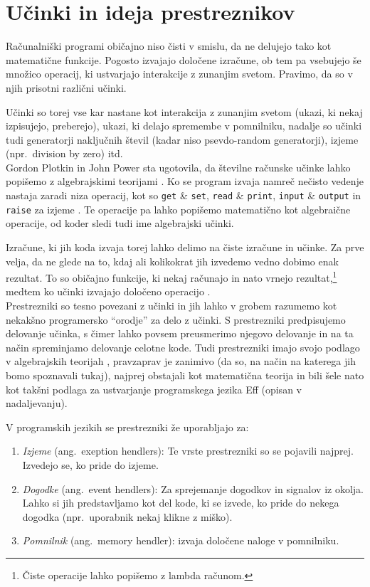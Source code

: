 \documentclass[a4paper,12pt]{article}
\theoremstyle{definition} %
\begin{document}
\section{Učinki in ideja prestreznikov}

Računalniški programi običajno niso čisti v smislu, da ne delujejo tako kot matematične funkcije. Pogosto izvajajo določene izračune, ob tem pa vsebujejo še množico operacij, ki ustvarjajo interakcije z zunanjim svetom. Pravimo, da so v njih prisotni različni učinki. 

Učinki so torej vse kar nastane kot interakcija z zunanjim svetom (ukazi, ki nekaj izpisujejo, preberejo), ukazi, ki delajo spremembe v pomnilniku, nadalje so učinki tudi generatorji naključnih števil (kadar niso psevdo-random generatorji), izjeme (npr.\ division by zero) itd. \\

Gordon Plotkin in John Power sta ugotovila, da številne računske učinke lahko popišemo z algebrajskimi teorijami \cite{algebraic}. Ko se program izvaja namreč nečisto vedenje nastaja zaradi niza operacij, kot so \lstinline{get} \& \lstinline{set}, \lstinline{read} \& \lstinline{print}, \lstinline{input} \& \lstinline{output} in \lstinline{raise} za izjeme \cite{introduction}. Te operacije pa lahko popišemo matematično kot algebraične operacije, od koder sledi tudi ime algebrajski učinki.

Izračune, ki jih koda izvaja torej lahko delimo na čiste izračune in učinke. Za prve velja, da ne glede na to, kdaj ali kolikokrat jih izvedemo vedno dobimo enak rezultat. To so običajno funkcije, ki nekaj računajo in nato vrnejo rezultat,\footnote{Čiste operacije lahko popišemo z lambda računom.} medtem ko učinki izvajajo določeno operacijo \cite{algebraic}. \\

Prestrezniki so tesno povezani z učinki in jih lahko v grobem razumemo kot nekakšno programersko  "`orodje"' za delo z učinki. S prestrezniki predpisujemo delovanje učinka, s čimer lahko povsem preusmerimo njegovo delovanje in na ta način spreminjamo delovanje celotne kode. Tudi prestrezniki imajo svojo podlago v algebrajskih teorijah \cite{algebraic}, pravzaprav je zanimivo (da so, na način na katerega jih bomo spoznavali tukaj), najprej obstajali kot matematična teorija in bili šele nato kot takšni podlaga za ustvarjanje programskega jezika Eff (opisan v nadaljevanju).

V programskih jezikih se prestrezniki že uporabljajo za:
\begin{enumerate}
\item \emph{Izjeme} (ang.\ exeption hendlers):  Te vrste prestrezniki so se pojavili najprej. Izvedejo se, ko pride do izjeme.
\item  \emph{Dogodke} (ang.\ event hendlers): Za sprejemanje dogodkov in signalov iz okolja. Lahko si jih predstavljamo kot del kode, ki se izvede, ko pride do nekega dogodka (npr.\ uporabnik nekaj klikne z miško).
\item \emph{Pomnilnik} (ang.\ memory hendler): izvaja določene naloge v pomnilniku.
\end{enumerate}
\end{document}
